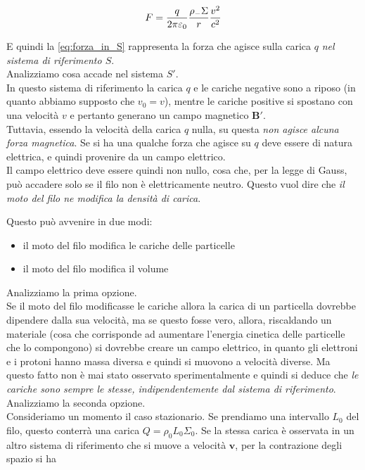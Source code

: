 \begin{equation}\label{eq:forza_in_S}
    F = \frac{q}{2 \pi \varepsilon_0} \frac{\rho_{-} \Sigma}{r} \frac{v^2}{c^2}
\end{equation}

E quindi la \eqref{eq:forza_in_S} rappresenta la forza che agisce sulla carica $q$ \emph{nel sistema di riferimento $S$}.\\

Analizziamo cosa accade nel sistema $S'$. \\
In questo sistema di riferimento la carica $q$ e le cariche negative sono a riposo (in quanto abbiamo supposto che $v_0 = v$), mentre le cariche positive si spostano con una velocità $v$ e pertanto generano un campo magnetico $\mathbf{B}'$. \\
Tuttavia, essendo la velocità della carica $q$ nulla, su questa \emph{non agisce alcuna forza magnetica}. Se si ha una qualche forza che agisce su $q$ deve essere di natura elettrica, e quindi provenire da un campo elettrico.\\
Il campo elettrico deve essere quindi non nullo, cosa che, per la legge di Gauss, può accadere solo se il filo non è elettricamente neutro. Questo vuol dire che \emph{il moto del filo ne modifica la densità di carica}.

\newpage

Questo può avvenire in due modi: 

\begin{itemize}
    \item il moto del filo modifica le cariche delle particelle 
    \item il moto del filo modifica il volume 
\end{itemize}

Analizziamo la prima opzione.\\
Se il moto del filo modificasse le cariche allora la carica di un particella dovrebbe dipendere dalla sua velocità, ma se questo fosse vero, allora, riscaldando un materiale (cosa che corrisponde ad aumentare l'energia cinetica delle particelle che lo compongono) si dovrebbe creare un campo elettrico, in quanto gli elettroni e i protoni hanno massa diversa e quindi si muovono a velocità diverse. 
Ma questo fatto non è mai stato osservato sperimentalmente e quindi si deduce che \emph{le cariche sono sempre le stesse, indipendentemente dal sistema di riferimento}. \\

Analizziamo la seconda opzione.\\
Consideriamo un momento il caso stazionario. Se prendiamo una intervallo $L_0$ del filo, questo conterrà una carica $Q = \rho_0 L_0 \Sigma_0$. Se la stessa carica è osservata in un altro sistema di riferimento che si muove a velocità $\mathbf{v}$, per la contrazione degli spazio si ha 


